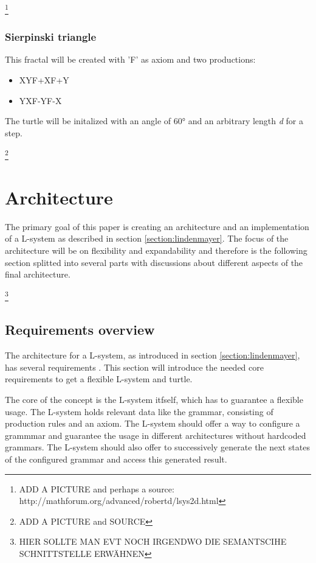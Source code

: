 \documentclass[english]{cpp-hmwk}
\begin{document}
\footnote{ADD A PICTURE and perhaps a source: http://mathforum.org/advanced/robertd/lsys2d.html}

\subsubsection{Sierpinski triangle}
This fractal will be created with 'F' as axiom and two productions:

\begin{itemize}
\item X\rightarrow YF+XF+Y
\item Y\rightarrow XF-YF-X
\end{itemize}

\noindent The turtle will be initalized with an angle of 60° and an arbitrary length \textit{d} for a step.
 
\footnote{ADD A PICTURE and SOURCE}


\pagebreak
\section{Architecture}
The primary goal of this paper is creating an architecture and an implementation of a L-system as described in section \ref{section:lindenmayer}. The focus of the architecture will be on flexibility and expandability and therefore is the following section splitted into several parts with discussions about different aspects of the final architecture.

\footnote{HIER SOLLTE MAN EVT NOCH IRGENDWO DIE SEMANTSCIHE SCHNITTSTELLE ERWÄHNEN}

\subsection{Requirements overview}
The architecture for a L-system, as introduced in section \ref{section:lindenmayer}, has several requirements . This section will introduce the needed core requirements to get a flexible L-system and turtle.

\medskip
\noindent The core of the concept is the L-system itfself, which has to guarantee a flexible usage. The L-system holds relevant data like the grammar, consisting of production rules and an axiom. The L-system should offer a way to configure a grammmar and guarantee the usage in different architectures without hardcoded grammars. The L-system should also offer to successively generate the next states of the configured grammar and access this generated result.
\end{document}
